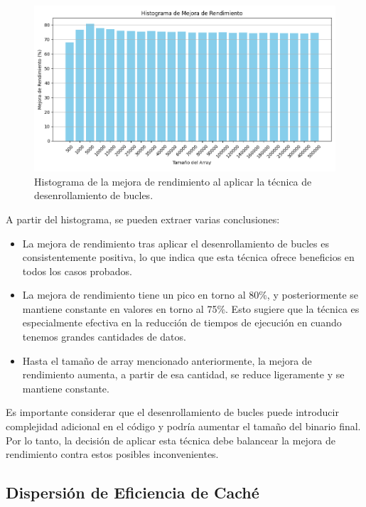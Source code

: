 \documentclass[a4paper,twocolumn]{article}
\begin{document}
\begin{figure}[H]
    \centering
    \includegraphics[width=\columnwidth]{img/improvement.png}
    \caption{Histograma de la mejora de rendimiento al aplicar la técnica de desenrollamiento de bucles.}
    \label{fig:histograma_mejora_rendimiento}
\end{figure}


A partir del histograma, se pueden extraer varias conclusiones:

\begin{itemize}
    \item La mejora de rendimiento tras aplicar el desenrollamiento de bucles es consistentemente positiva, lo que indica que esta técnica ofrece beneficios en todos los casos probados.
    \item La mejora de rendimiento tiene un pico en torno al 80\%, y posteriormente se mantiene constante en valores en torno al 75\%. Esto sugiere que la técnica es especialmente efectiva en la reducción de tiempos de ejecución en cuando tenemos grandes cantidades de datos.
    \item Hasta el tamaño de array mencionado anteriormente, la mejora de rendimiento aumenta, a partir de esa cantidad, se reduce ligeramente y se mantiene constante. 
\end{itemize}

Es importante considerar que el desenrollamiento de bucles puede introducir complejidad adicional en el código y podría aumentar el tamaño del binario final. Por lo tanto, la decisión de aplicar esta técnica debe balancear la mejora de rendimiento contra estos posibles inconvenientes.

\subsection{Dispersión de Eficiencia de Caché}
\end{document}
